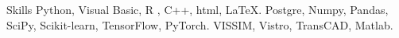 
\begin{rubric}{Skills}
	Python, Visual Basic,  R ,  C++,  html,  \LaTeX.
	Postgre, Numpy, Pandas, SciPy, Scikit-learn, TensorFlow, PyTorch.
\entry*[Simulation]
	VISSIM, Vistro, TransCAD, Matlab.

\end{rubric}
